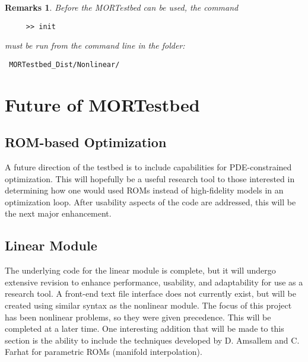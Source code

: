 \documentclass[notitlepage]{report}
\newtheorem*{Rem}{Remarks}
\begin{document}
\begin{Rem}
  Before the MORTestbed can be used, the command
  \begin{verbatim}
     >> init
  \end{verbatim} must be run from the command line in the folder: \begin{verbatim} MORTestbed_Dist/Nonlinear/ \end{verbatim}
\end{Rem}




\chapter{Future of MORTestbed}\label{ch:future}
  \section{ROM-based Optimization}
  A future direction of the testbed is to include capabilities for PDE-constrained optimization.  This will hopefully be a useful research tool to those interested in determining how one would used ROMs instead of high-fidelity models in an optimization loop.  After usability aspects of the code are addressed, this will be the next major enhancement.

  \section{Linear Module}
The underlying code for the linear module is complete, but it will undergo extensive revision to enhance performance, usability, and adaptability for use as a research tool.  A front-end text file interface does not currently exist, but will be created using similar syntax as the nonlinear module.  The focus of this project has been nonlinear problems, so they were given precedence.  This will be completed at a later time.  One interesting addition that will be made to this section is the ability to include the techniques developed by D. Amsallem and C. Farhat for parametric ROMs (manifold interpolation).
\end{document}
